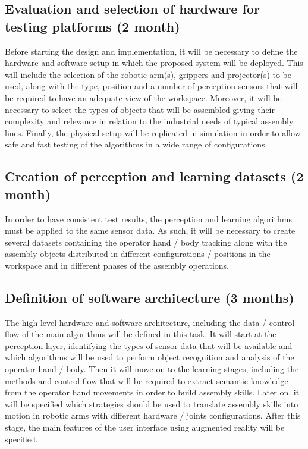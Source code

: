 \subsection{Evaluation and selection of hardware for testing platforms (2 month)}

Before starting the design and implementation, it will be necessary to define the hardware and software setup in which the proposed system will be deployed. This will include the selection of the robotic arm(s), grippers and projector(s) to be used, along with the type, position and a number of perception sensors that will be required to have an adequate view of the workspace. Moreover, it will be necessary to select the types of objects that will be assembled giving their complexity and relevance in relation to the industrial needs of typical assembly lines.
Finally, the physical setup will be replicated in simulation in order to allow safe and fast testing of the algorithms in a wide range of configurations.


\subsection{Creation of perception and learning datasets (2 month)}

In order to have consistent test results, the perception and learning algorithms must be applied to the same sensor data. As such, it will be necessary to create several datasets containing the operator hand / body tracking along with the assembly objects distributed in different configurations / positions in the workspace and in different phases of the assembly operations.


\subsection{Definition of software architecture (3 months)}

The high-level hardware and software architecture, including the data / control flow of the main algorithms will be defined in this task. It will start at the perception layer, identifying the types of sensor data that will be available and which algorithms will be used to perform object recognition and analysis of the operator hand / body. Then it will move on to the learning stages, including the methods and control flow that will be required to extract semantic knowledge from the operator hand movements in order to build assembly skills. Later on, it will be specified which strategies should be used to translate assembly skills into motion in robotic arms with different hardware / joints configurations. After this stage, the main features of the user interface using augmented reality will be specified.


